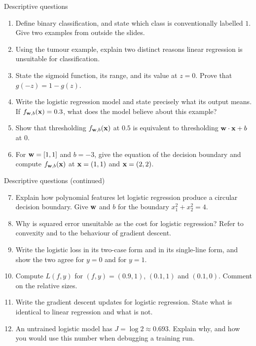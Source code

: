 \documentclass[aspectratio=169,10pt]{beamer}
\begin{document}
\begin{frame}{Descriptive questions}
  \footnotesize
  \begin{enumerate}
    \item Define binary classification, and state which class is conventionally labelled $1$.
          Give two examples from outside the slides. \hfill{}
    \item Using the tumour example, explain two distinct reasons linear regression is
          unsuitable for classification. \hfill{}
    \item State the sigmoid function, its range, and its value at $z=0$. Prove that
          $g(-z)=1-g(z)$. \hfill{}
    \item Write the logistic regression model and state precisely what its output means. If
          $f_{\mathbf{w},b}(\mathbf{x})=0.3$, what does the model believe about this example? \hfill{}
    \item Show that thresholding $f_{\mathbf{w},b}(\mathbf{x})$ at $0.5$ is equivalent to thresholding
          $\mathbf{w}\cdot\mathbf{x}+b$ at $0$. \hfill{}
    \item For $\mathbf{w}=[1,1]$ and $b=-3$, give the equation of the decision boundary and compute
          $f_{\mathbf{w},b}(\mathbf{x})$ at $\mathbf{x}=(1,1)$ and $\mathbf{x}=(2,2)$. \hfill{}
  \end{enumerate}
\end{frame}

\begin{frame}{Descriptive questions (continued)}
  \footnotesize
  \begin{enumerate}\setcounter{enumi}{6}
    \item Explain how polynomial features let logistic regression produce a circular decision
          boundary. Give $\mathbf{w}$ and $b$ for the boundary $x_1^2+x_2^2=4$. \hfill{}
    \item Why is squared error unsuitable as the cost for logistic regression? Refer to
          convexity and to the behaviour of gradient descent. \hfill{}
    \item Write the logistic loss in its two-case form and in its single-line form, and show
          the two agree for $y=0$ and for $y=1$. \hfill{}
    \item Compute $L(f,y)$ for $(f,y)=(0.9,1)$, $(0.1,1)$ and $(0.1,0)$. Comment on the
          relative sizes. \hfill{}
    \item Write the gradient descent updates for logistic regression. State what is identical
          to linear regression and what is not. \hfill{}
    \item An untrained logistic model has $J=\log 2 \approx 0.693$. Explain why, and how you
          would use this number when debugging a training run. \hfill{}
  \end{enumerate}
\end{frame}
\end{document}
